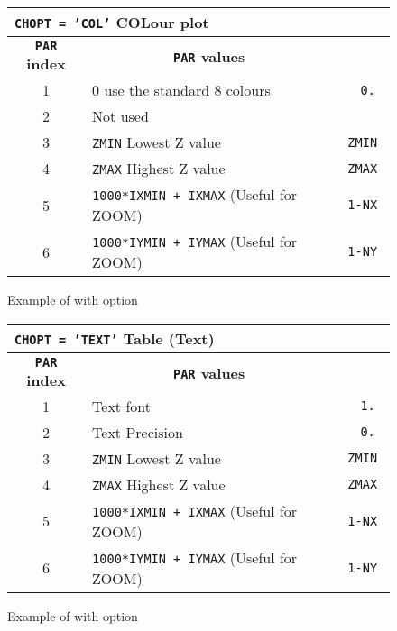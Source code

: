 \begin{figure}[p]
\begin{center}
\begin{tabular}{||c|p{12cm}|>{\tt}r||}
\hline
\multicolumn{3}{||l||}{\bf {\tt CHOPT = 'COL'} COLour plot}
\\
\hline
\multicolumn{1}{||c|}{\bf {\tt PAR} index}        &
\multicolumn{1}{c|}{\bf {\tt PAR} values}         &
\multicolumn{1}{c||}{\bf default}                \\
\hline
 1  & 0 use the standard 8 colours                                  &   0.    \\
 2  & Not used                                                      &         \\
 3  & {\tt ZMIN} Lowest Z value                                     &   ZMIN  \\
 4  & {\tt ZMAX} Highest Z value                                    &   ZMAX  \\
 5  & {\tt 1000*IXMIN + IXMAX} (Useful for ZOOM)                    &   1-NX  \\
 6  & {\tt 1000*IYMIN + IYMAX} (Useful for ZOOM)                    &   1-NY  \\
\hline
\end{tabular}
\end{center}
\bigskip
\begin{center} \mbox{} \end{center}
\caption{Example of \protect{} with \protect{} option}
\end{figure}

\begin{figure}[p]
\begin{center}
\begin{tabular}{||c|p{12cm}|>{\tt}r||}
\hline
\multicolumn{3}{||l||}{\bf {\tt CHOPT = 'TEXT'} Table (Text)}
\\
\hline
\multicolumn{1}{||c|}{\bf {\tt PAR} index}        &
\multicolumn{1}{c|}{\bf {\tt PAR} values}         &
\multicolumn{1}{c||}{\bf default}                \\
\hline
 1  & Text font                                                     &   1.    \\
 2  & Text Precision                                                &   0.    \\
 3  & {\tt ZMIN} Lowest Z value                                     &   ZMIN  \\
 4  & {\tt ZMAX} Highest Z value                                    &   ZMAX  \\
 5  & {\tt 1000*IXMIN + IXMAX} (Useful for ZOOM)                    &   1-NX  \\
 6  & {\tt 1000*IYMIN + IYMAX} (Useful for ZOOM)                    &   1-NY  \\
\hline
\end{tabular}
\end{center}
\bigskip
\begin{center} \mbox{} \end{center}
\caption{Example of \protect{} with \protect{} option}
\end{figure}

